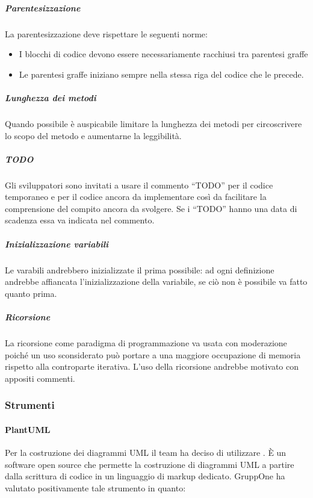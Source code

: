 \documentclass[../../norme-di-progetto.tex]{subfiles}
\begin{document}
\subparagraph{Parentesizzazione}%
\label{subp:parentesizzazione}
La parentesizzazione deve rispettare le seguenti norme:
\begin{itemize}
  \item I blocchi di codice devono essere necessariamente racchiusi tra parentesi graffe
  \item Le parentesi graffe iniziano sempre nella stessa riga del codice che le precede.
\end{itemize}

\subparagraph{Lunghezza dei metodi}%
\label{subp:lunghezza_metodi}
Quando possibile è auspicabile limitare la lunghezza dei metodi per circoscrivere lo scopo del metodo e aumentarne la leggibilità.

\subparagraph{TODO}%
\label{subp:TODO}
Gli sviluppatori sono invitati a usare il commento ``TODO'' per il codice temporaneo e per il codice ancora da implementare così da facilitare la comprensione del compito ancora da svolgere.
Se i ``TODO'' hanno una data di scadenza essa va indicata nel commento.

\subparagraph{Inizializzazione variabili}%
\label{subp:inizializzazione_variabili}
Le varabili andrebbero inizializzate il prima possibile: ad ogni definizione andrebbe affiancata l'inizializzazione della variabile, se ciò non è possibile va fatto quanto prima.

\subparagraph{Ricorsione}%
\label{subp:ricorsione}
La ricorsione come paradigma di programmazione va usata con moderazione poiché un uso sconsiderato può portare a una maggiore occupazione di memoria rispetto alla controparte iterativa.
L'uso della ricorsione andrebbe motivato con appositi commenti.
\subsubsection{Strumenti}%
\label{subs:strumenti}

\paragraph{PlantUML}%
\label{par:plantuml}
Per la costruzione dei diagrammi UML il team ha deciso di utilizzare \@.
È un software open source che permette la costruzione di diagrammi UML a partire dalla scrittura di codice in un linguaggio di markup dedicato. GruppOne ha valutato positivamente tale strumento in quanto:
\end{document}
